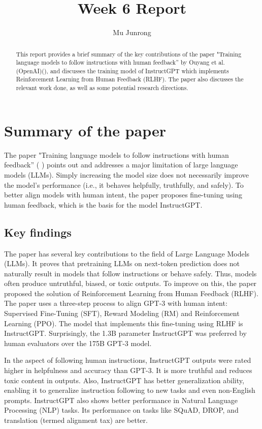 \documentclass{article} %
\title{Week 6 Report}
\author{Mu Junrong}
\begin{document}
\ifcolmsubmission
\linenumbers
\fi

\maketitle

\begin{abstract}
This report provides a brief summary of the key contributions of the paper "Training language models to follow instructions with human feedback” by Ouyang et al. (OpenAI)(\cite{ouyang2022instructgpt}), and discusses the training model of InstructGPT which implements Reinforcement Learning from Human Feedback (RLHF). The paper also discusses the relevant work done, as well as some potential research directions.
\end{abstract}

\section{Summary of the paper}
The paper "Training language models to follow instructions with human feedback” (
\cite{ouyang2022instructgpt}) points out and addresses a major limitation of large language models (LLMs). Simply increasing the model size does not necessarily improve the model's performance (i.e., it behaves helpfully, truthfully, and safely). To better align models with human intent, the paper proposes fine-tuning using human feedback, which is the basis for the model InstructGPT.

\subsection{Key findings}
The paper has several key contributions to the field of Large Language Models (LLMs). It proves that pretraining LLMs on next-token prediction does not naturally result in models that follow instructions or behave safely. Thus, models often produce untruthful, biased, or toxic outputs. To improve on this, the paper proposed the solution of Reinforcement Learning from Human Feedback (RLHF). The paper uses a three-step process to align GPT-3 with human intent: Supervised Fine-Tuning (SFT), Reward Modeling (RM) and Reinforcement Learning (PPO). The model that implements this fine-tuning using RLHF is InstructGPT. Surprisingly, the 1.3B parameter InstructGPT was preferred by human evaluators over the 175B GPT-3 model.

In the aspect of following human instructions, InstructGPT outputs were rated higher in helpfulness and accuracy than GPT-3. It is more truthful and reduces toxic content in outputs. Also, InstructGPT has better generalization ability, enabling it to generalize instruction following to new tasks and even non-English prompts. InstructGPT also shows better performance in Natural Language Processing (NLP) tasks. Its performance on tasks like SQuAD, DROP, and translation (termed alignment tax) are better.
\end{document}
